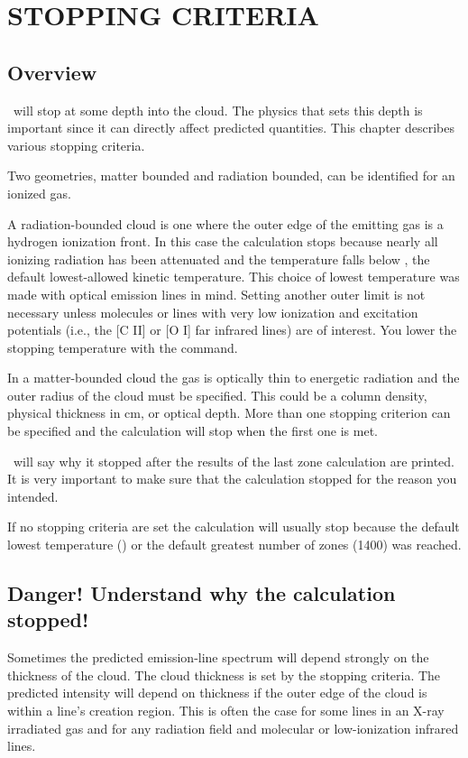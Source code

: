 \chapter{STOPPING CRITERIA}

\section{Overview}

\Cloudy\ will stop at some depth into the cloud.
The physics that sets
this depth is important since it can directly affect predicted quantities.
This chapter describes various stopping criteria.

Two geometries, matter bounded and radiation bounded, can be identified
for an ionized gas.

A radiation-bounded cloud is one where the outer edge of the emitting
gas is a hydrogen ionization front.
In this case the calculation stops
because nearly all ionizing radiation has been attenuated and the temperature
falls below \TEMPSTOPDEFAULT, the default lowest-allowed kinetic temperature.
This
choice of lowest temperature was made with optical emission lines in mind.
Setting another outer limit is not necessary unless molecules or lines with
very low ionization and excitation potentials (i.e., the [C II] or [O I]
far infrared lines) are of interest.
You lower
the stopping temperature with the  command.

In a matter-bounded cloud the gas is optically thin to energetic radiation
and the outer radius of the cloud must be specified.
This could be a column
density, physical thickness in cm, or optical depth.
More than one stopping
criterion can be specified and the calculation will stop when the first
one is met.

\Cloudy\ will say why it stopped after the results of the last zone
calculation are printed.
It is very important to make sure that the
calculation stopped for the reason you intended.

If no stopping criteria are set the calculation will usually stop because
the default lowest temperature (\TEMPSTOPDEFAULT) or the default greatest number of
zones (1400) was reached.

\section{Danger!  Understand why the calculation stopped!}

Sometimes the predicted emission-line spectrum will depend strongly on
the thickness of the cloud.
The cloud thickness is set by the stopping
criteria.
The predicted intensity will depend on thickness if the outer
edge of the cloud is within a line's creation region.
This is often the
case for some lines in an X-ray irradiated gas and for any radiation field
and molecular or low-ionization infrared lines.


